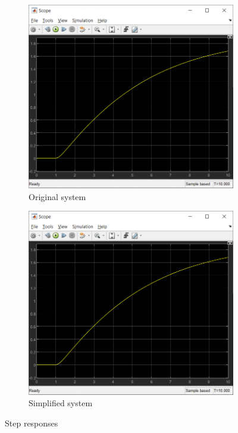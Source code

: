 \documentclass{article}
\begin{document}
\begin{figure}[H]
   	 \centering
     \begin{subfigure}[b]{0.45\textwidth}
         \centering
         \includegraphics[width=\textwidth]{sources/image2_2.png}
         \caption{Original system}
         \label{fig:fig2}
     \end{subfigure}
     \hfill
     \begin{subfigure}[b]{0.45\textwidth}
         \centering
         \includegraphics[width=\textwidth]{sources/image2_3.png}
         \caption{Simplified system}
         \label{fig:fig3}
     \end{subfigure}
     \caption{Step responses}
\end{figure}
\end{document}
